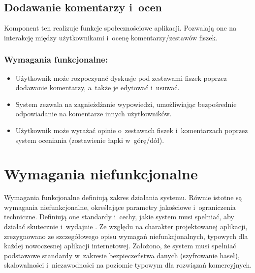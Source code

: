 \subsection*{Dodawanie komentarzy i~ocen}
Komponent ten realizuje funkcje społecznościowe aplikacji. Pozwalają one na interakcję
między użytkownikami i~ocenę komentarzy/zestawów fiszek.

\subsubsection*{Wymagania funkcjonalne:}
\begin{itemize}
    \item Użytkownik może rozpoczynać dyskusje pod zestawami fiszek poprzez dodawanie komentarzy, a~także je edytować i~usuwać. 
    \item System zezwala na zagnieżdżanie wypowiedzi, umożliwiając bezpośrednie odpowiadanie na komentarze innych użytkowników.
    \item Użytkownik może wyrażać opinie o~zestawach fiszek i~komentarzach poprzez system oceniania (zostawienie łapki w~górę/dół).
\end{itemize}

\section{Wymagania niefunkcjonalne}
\label{sec:wymagania_niefunkcjonalne}

Wymagania funkcjonalne definiują zakres działania systemu.
Równie istotne są wymagania niefunkcjonalne, określające parametry jakościowe i~ograniczenia techniczne. 
Definiują one standardy i~cechy, jakie system musi spełniać, aby działać skutecznie i~wydajnie \cite{sommerville2015}. 
Ze względu na charakter projektowanej aplikacji, zrezygnowano ze szczegółowego opisu wymagań niefunkcjonalnych, typowych dla 
każdej nowoczesnej aplikacji internetowej. Założono, że system musi spełniać podstawowe standardy w~zakresie bezpieczeństwa danych 
(szyfrowanie haseł), skalowalności i~niezawodności na poziomie typowym dla rozwiązań komercyjnych. 

